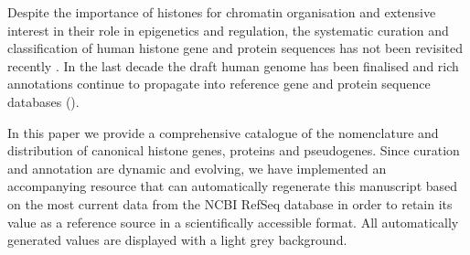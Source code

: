   Despite the importance of histones for chromatin organisation and extensive interest
  in their role in epigenetics and regulation, the systematic curation and classification of human histone
  gene and protein sequences has not been revisited recently \citep{Marzluff02}.
  In the last decade the draft human genome has been finalised 
  and rich annotations continue to propagate into reference gene and protein sequence databases ().


  In this paper we provide a comprehensive catalogue of the nomenclature and distribution 
  of canonical histone genes, proteins and pseudogenes. 
  Since curation and annotation are dynamic and evolving, we have implemented an accompanying resource 
  that can automatically regenerate this manuscript based on the most current data from the NCBI RefSeq database 
  in order to retain its value as a reference source in a scientifically accessible format.
  All automatically generated values are displayed with a light grey background.

